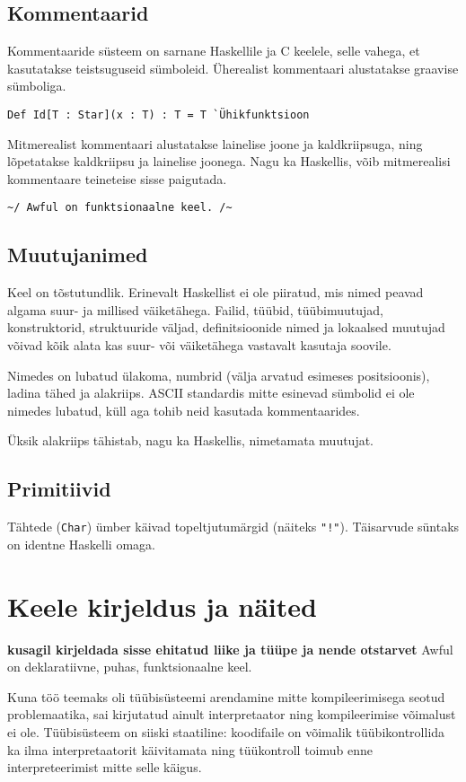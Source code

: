 \documentclass[12pt]{article}
\newcommand\peatykk[1]{
  \clearpage
  \section{#1}}
\newcommand\markus[1]{\textcolor{roheline}{\textbf{#1}}}
\begin{document}
    \subsection{Kommentaarid}\label{kommentaarid}
      Kommentaaride süsteem on sarnane Haskellile ja C keelele, selle vahega, et kasutatakse teistsuguseid sümboleid. Üherealist kommentaari alustatakse graavise sümboliga.

      \begin{verbatim}Def Id[T : Star](x : T) : T = T `Ühikfunktsioon\end{verbatim}

      Mitmerealist kommentaari alustatakse lainelise joone ja kaldkriipsuga, ning lõpetatakse kaldkriipsu ja lainelise joonega. Nagu ka Haskellis, võib mitmerealisi kommentaare teineteise sisse paigutada.

      \begin{verbatim}~/ Awful on funktsionaalne keel. /~\end{verbatim}
    \subsection{Muutujanimed}
      Keel on tõstutundlik. Erinevalt Haskellist ei ole piiratud, mis nimed peavad algama suur- ja millised väiketähega. Failid, tüübid, tüübimuutujad, konstruktorid, struktuuride väljad, definitsioonide nimed ja lokaalsed muutujad võivad kõik alata kas suur- või väiketähega vastavalt kasutaja soovile.

      Nimedes on lubatud ülakoma, numbrid (välja arvatud esimeses positsioonis), ladina tähed ja alakriips. ASCII standardis mitte esinevad sümbolid ei ole nimedes lubatud, küll aga tohib neid kasutada kommentaarides.

      Üksik alakriips tähistab, nagu ka Haskellis, nimetamata muutujat.
    \subsection{Primitiivid}\label{primitiivid}
      Tähtede (\verb!Char!) ümber käivad topeltjutumärgid (näiteks \verb#"!"#). Täisarvude süntaks on identne Haskelli omaga.
  \peatykk{Keele kirjeldus ja näited}\label{manual}
    \markus{kusagil kirjeldada sisse ehitatud liike ja tüüpe ja nende otstarvet} Awful on deklaratiivne, puhas, funktsionaalne keel.

    Kuna töö teemaks oli tüübisüsteemi arendamine mitte kompileerimisega seotud problemaatika, sai kirjutatud ainult interpretaator ning kompileerimise võimalust ei ole. Tüübisüsteem on siiski staatiline: koodifaile on võimalik tüübikontrollida ka ilma interpretaatorit käivitamata ning tüükontroll toimub enne interpreteerimist mitte selle käigus.
\end{document}
